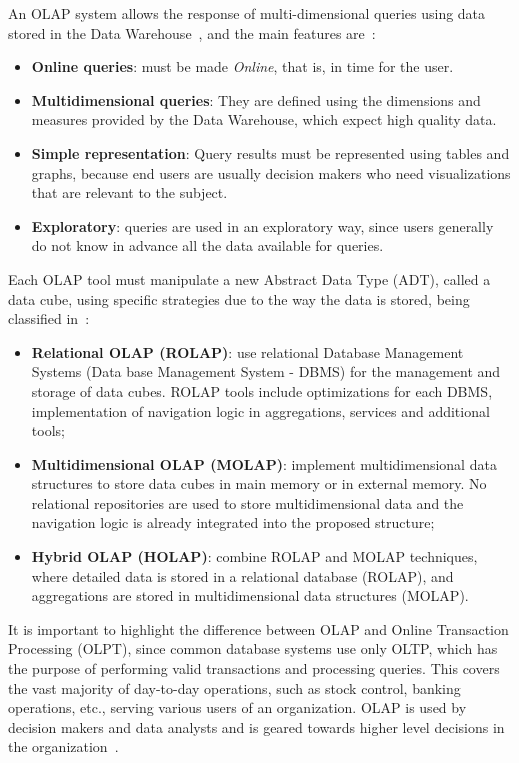 An OLAP system allows the response of multi-dimensional queries using data stored in the Data Warehouse~\cite{kimballDataWarehouseToolkit2013}, and the main features are~\cite{bimonteOpenIssuesBig2016}:

\begin{itemize}
  \item \textbf{Online queries}: must be made \textit{Online}, that is, in time for the user.
  \item \textbf{Multidimensional queries}: They are defined using the dimensions and measures provided by the Data Warehouse, which expect high quality data.
  \item \textbf{Simple representation}: Query results must be represented using tables and graphs, because end users are usually decision makers who need visualizations that are relevant to the subject.
  \item \textbf{Exploratory}: queries are used in an exploratory way, since users generally do not know in advance all the data available for queries.
\end{itemize}

Each OLAP tool must manipulate a new Abstract Data Type (ADT), called a data cube, using specific strategies due to the way the data is stored, being classified in~\cite{moreiraFullPartialData2012}:

\begin{itemize}
  \item \textbf{Relational OLAP (ROLAP)}: use relational Database Management Systems (Data base Management System - DBMS) for the management and storage of data cubes.
    ROLAP tools include optimizations for each DBMS, implementation of navigation logic in aggregations, services and additional tools;
  \item \textbf{Multidimensional OLAP (MOLAP)}: implement multidimensional data structures to store data cubes in main memory or in external memory.
    No relational repositories are used to store multidimensional data and the navigation logic is already integrated into the proposed structure;
  \item \textbf{Hybrid OLAP (HOLAP)}: combine ROLAP and MOLAP techniques, where detailed data is stored in a relational database (ROLAP), and aggregations are stored in multidimensional data structures (MOLAP).
\end{itemize}

It is important to highlight the difference between OLAP and Online Transaction Processing (OLPT), since common database systems use only OLTP, which has the purpose of performing valid transactions and processing queries.
This covers the vast majority of day-to-day operations, such as stock control, banking operations, etc., serving various users of an organization.
OLAP is used by decision makers and data analysts and is geared towards higher level decisions in the organization~\cite{hanDataMiningConcepts2011}.

